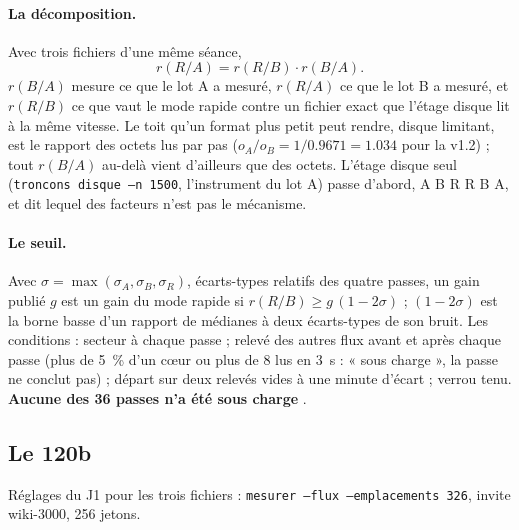 \paragraph{La décomposition.} Avec trois fichiers d'une même séance,
\[
r(R/A) = r(R/B) \cdot r(B/A) .
\]
$r(B/A)$ mesure ce que le lot A a mesuré, $r(R/A)$ ce que le lot B a mesuré, et $r(R/B)$ ce que vaut le mode rapide contre un fichier exact que l'étage disque lit à la même vitesse. Le toit qu'un format plus petit peut rendre, disque limitant, est le rapport des octets lus par pas ($o_A / o_B = 1/\num{0.9671} = \num{1.034}$ pour la v1.2) ; tout $r(B/A)$ au-delà vient d'ailleurs que des octets. L'étage disque seul (\texttt{troncons disque --n 1500}, l'instrument du lot A) passe d'abord, A B R R B A, et dit lequel des facteurs n'est pas le mécanisme.

\paragraph{Le seuil.} Avec $\sigma = \max(\sigma_A, \sigma_B, \sigma_R)$, écarts-types relatifs des quatre passes, un gain publié $g$ est un gain du mode rapide si $r(R/B) \ge g\,(1 - 2\sigma)$ ; $(1 - 2\sigma)$ est la borne basse d'un rapport de médianes à deux écarts-types de son bruit. Les conditions : secteur à chaque passe ; relevé des autres flux avant et après chaque passe (plus de \SI{5}{\percent} d'un cœur ou plus de \SI{8}{\Mo} lus en \SI{3}{\second} : « sous charge », la passe ne conclut pas) ; départ sur deux relevés vides à une minute d'écart ; verrou tenu. \textbf{Aucune des 36 passes n'a été sous charge} \mes.

\subsection{Le 120b}\label{t3jug:sec:v120}

Réglages du J1 pour les trois fichiers : \texttt{mesurer --flux --emplacements 326}, invite wiki-3000, 256 jetons.

